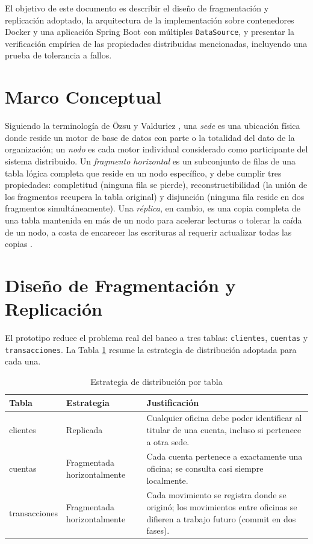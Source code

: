 \documentclass[conference]{IEEEtran}
\begin{document}
El objetivo de este documento es describir el dise\~no de fragmentaci\'on y
replicaci\'on adoptado, la arquitectura de la implementaci\'on sobre contenedores
Docker y una aplicaci\'on Spring Boot con m\'ultiples \texttt{DataSource}, y
presentar la verificaci\'on emp\'irica de las propiedades distribuidas mencionadas,
incluyendo una prueba de tolerancia a fallos.

\section{Marco Conceptual}

Siguiendo la terminolog\'ia de \"Ozsu y Valduriez \cite{ozsu2020}, una \emph{sede}
es una ubicaci\'on f\'isica donde reside un motor de base de datos con parte o
la totalidad del dato de la organizaci\'on; un \emph{nodo} es cada motor
individual considerado como participante del sistema distribuido. Un
\emph{fragmento horizontal} es un subconjunto de filas de una tabla l\'ogica
completa que reside en un nodo espec\'ifico, y debe cumplir tres propiedades:
completitud (ninguna fila se pierde), reconstructibilidad (la uni\'on de los
fragmentos recupera la tabla original) y disjunci\'on (ninguna fila reside en
dos fragmentos simult\'aneamente). Una \emph{r\'eplica}, en cambio, es una copia
completa de una tabla mantenida en m\'as de un nodo para acelerar lecturas o
tolerar la ca\'ida de un nodo, a costa de encarecer las escrituras al requerir
actualizar todas las copias \cite{kleppmann2017}.

\section{Dise\~no de Fragmentaci\'on y Replicaci\'on}

El prototipo reduce el problema real del banco a tres tablas: \texttt{clientes},
\texttt{cuentas} y \texttt{transacciones}. La Tabla \ref{tab:estrategia} resume
la estrategia de distribuci\'on adoptada para cada una.

\begin{table}[h]
\centering
\caption{Estrategia de distribuci\'on por tabla}
\label{tab:estrategia}
\begin{tabular}{|p{1.6cm}|p{1.6cm}|p{3.5cm}|}
\hline
\textbf{Tabla} & \textbf{Estrategia} & \textbf{Justificaci\'on} \\
\hline
clientes & Replicada & Cualquier oficina debe poder identificar al titular de
una cuenta, incluso si pertenece a otra sede. \\
\hline
cuentas & Fragmentada horizontalmente & Cada cuenta pertenece a exactamente
una oficina; se consulta casi siempre localmente. \\
\hline
transacciones & Fragmentada horizontalmente & Cada movimiento se registra donde
se origin\'o; los movimientos entre oficinas se difieren a trabajo futuro
(commit en dos fases). \\
\hline
\end{tabular}
\end{table}
\end{document}
